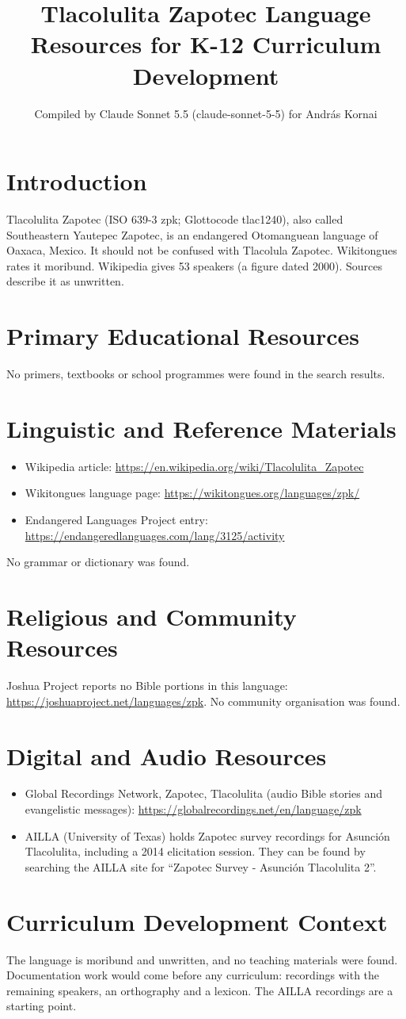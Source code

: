 \documentclass[12pt]{article}
\title{Tlacolulita Zapotec Language Resources for K-12 Curriculum Development}
\author{Compiled by Claude Sonnet 5.5 (claude-sonnet-5-5) for Andr\'as Kornai}
\date{}
\begin{document}
\maketitle

\section{Introduction}
Tlacolulita Zapotec (ISO 639-3 zpk; Glottocode tlac1240), also called Southeastern Yautepec Zapotec, is an endangered Otomanguean language of Oaxaca, Mexico. It should not be confused with Tlacolula Zapotec. Wikitongues rates it moribund. Wikipedia gives 53 speakers (a figure dated 2000). Sources describe it as unwritten.

\section{Primary Educational Resources}
No primers, textbooks or school programmes were found in the search results.

\section{Linguistic and Reference Materials}
\begin{itemize}
\item Wikipedia article: \url{https://en.wikipedia.org/wiki/Tlacolulita_Zapotec}
\item Wikitongues language page: \url{https://wikitongues.org/languages/zpk/}
\item Endangered Languages Project entry: \url{https://endangeredlanguages.com/lang/3125/activity}
\end{itemize}
No grammar or dictionary was found.

\section{Religious and Community Resources}
Joshua Project reports no Bible portions in this language: \url{https://joshuaproject.net/languages/zpk}. No community organisation was found.

\section{Digital and Audio Resources}
\begin{itemize}
\item Global Recordings Network, Zapotec, Tlacolulita (audio Bible stories and evangelistic messages): \url{https://globalrecordings.net/en/language/zpk}
\item AILLA (University of Texas) holds Zapotec survey recordings for Asunci\'on Tlacolulita, including a 2014 elicitation session. They can be found by searching the AILLA site for ``Zapotec Survey - Asunci\'on Tlacolulita 2''.
\end{itemize}

\section{Curriculum Development Context}
The language is moribund and unwritten, and no teaching materials were found. Documentation work would come before any curriculum: recordings with the remaining speakers, an orthography and a lexicon. The AILLA recordings are a starting point.
\end{document}
